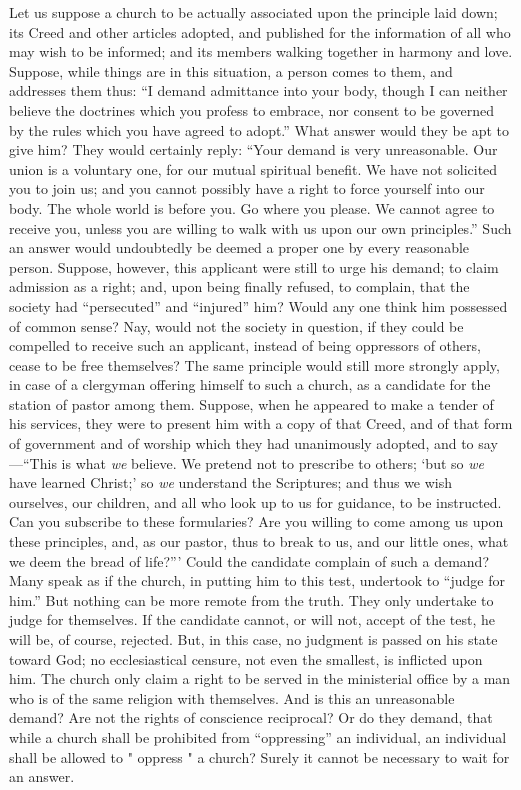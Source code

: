 \documentclass[
]{book}
\begin{document}
Let us suppose a church to be actually associated upon the principle laid down; its Creed and other articles adopted, and published for the information of all who may wish to be informed; and its members walking together in harmony and love. Suppose, while things are in this situation, a person comes to them, and addresses them thus: ``I demand admittance into your body, though I can neither believe the doctrines which you profess to embrace, nor consent to be governed by the rules which you have agreed to adopt.'' What answer would they be apt to give him? They would certainly reply: ``Your demand is very unreasonable. Our union is a voluntary one, for our mutual spiritual benefit. We have not solicited you to join us; and you cannot possibly have a right to force yourself into our body. The whole world is before you. Go where you please. We cannot agree to receive you, unless you are willing to walk with us upon our own principles.'' Such an answer would undoubtedly be deemed a proper one by every reasonable person. Suppose, however, this applicant were still to urge his demand; to claim admission as a right; and, upon being finally refused, to complain, that the society had ``persecuted'' and ``injured'' him? Would any one think him possessed of common sense? Nay, would not the society in question, if they could be compelled to receive such an applicant, instead of being oppressors of others, cease to be free themselves? The same principle would still more strongly apply, in case of a clergyman offering himself to such a church, as a candidate for the station of pastor among them. Suppose, when he appeared to make a tender of his services, they were to present him with a copy of that Creed, and of that form of government and of worship which they had unanimously adopted, and to say---``This is what \emph{we} believe. We pretend not to prescribe to others; `but so \emph{we} have learned Christ;' so \emph{we} understand the Scriptures; and thus we wish ourselves, our children, and all who look up to us for guidance, to be instructed. Can you subscribe to these formularies? Are you willing to come among us upon these principles, and, as our pastor, thus to break to us, and our little ones, what we deem the bread of life?''' Could the candidate complain of such a demand? Many speak as if the church, in putting him to this test, undertook to ``judge for him.'' But nothing can be more remote from the truth. They only undertake to judge for themselves. If the candidate cannot, or will not, accept of the test, he will be, of course, rejected. But, in this case, no judgment is passed on his state toward God; no ecclesiastical censure, not even the smallest, is inflicted upon him. The church only claim a right to be served in the ministerial office by a man who is of the same religion with themselves. And is this an unreasonable demand? Are not the rights of conscience reciprocal? Or do they demand, that while a church shall be prohibited from ``oppressing'' an individual, an individual shall be allowed to " oppress " a church? Surely it cannot be necessary to wait for an answer.
\end{document}
